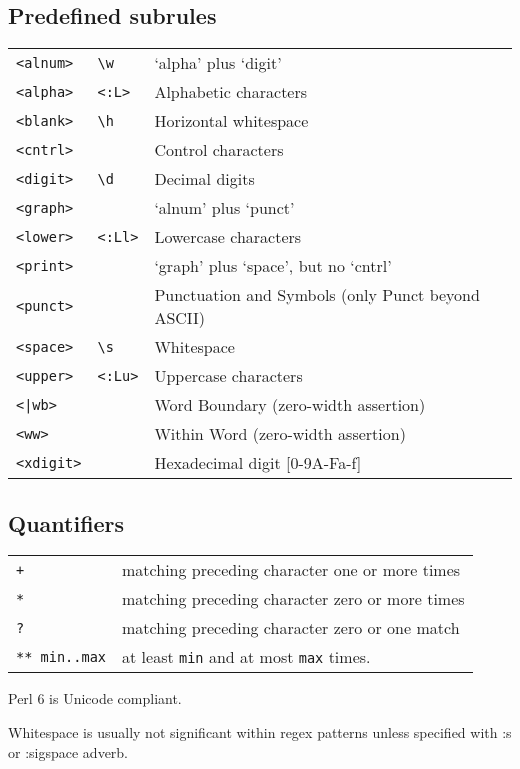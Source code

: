 \documentclass[12pt]{article}
\begin{document}
\subsection{Predefined subrules}
\begin{tabular}{@{}lp{3cm}p{6cm}}
	\verb|<alnum>|   & \verb|\w|      & `alpha' plus `digit'\\
	\verb|<alpha>|   & \verb|<:L>|     & Alphabetic characters\\
	\verb|<blank>|   & \verb|\h|      &  Horizontal whitespace\\
	\verb|<cntrl>|  &        &   Control characters\\
	\verb|<digit>|  &  \verb|\d|   &    Decimal digits\\
	\verb|<graph>|  &       &   `alnum' plus `punct'\\
	\verb|<lower>|  & \verb|<:Ll>|  &  Lowercase characters\\
	\verb|<print>|  &       &   `graph' plus `space', but no `cntrl'\\
	\verb|<punct>|  &      &    Punctuation and Symbols (only Punct beyond ASCII)\\
	\verb|<space>| &  \verb|\s|    &   Whitespace\\
	\verb|<upper>| &  \verb|<:Lu>|  &  Uppercase characters\\
	\texttt{<|wb>}   &       &     Word Boundary (zero-width assertion)\\
	\verb|<ww>|   &       &    Within Word (zero-width assertion)\\
	\verb|<xdigit>| &     &    Hexadecimal digit [0-9A-Fa-f]\\
	
	
	
	
	
\end{tabular}

\subsection{Quantifiers}
\begin{tabular}{@{}ll}
	\verb|+|	& matching preceding character one or more times\\
	\verb|*|	& matching preceding character zero or more times\\
	\verb|?|	& matching preceding character zero or one match\\
	\verb|** min..max|	& at least \verb|min| and at most \verb|max| times.\\
\end{tabular}

\vspace{20mm}	
	Perl 6 is Unicode compliant.
	
	Whitespace is usually not significant within regex patterns unless specified with :s or :sigspace adverb.
	
	
	
	
	
	
\end{document}
